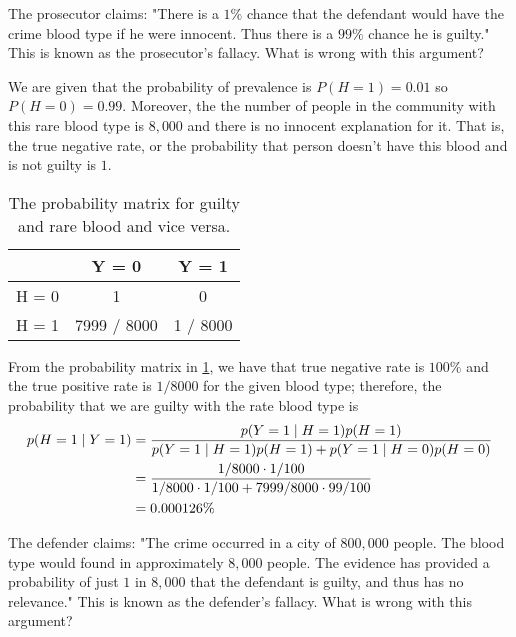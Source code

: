 \begin{exercise}
	\begin{exercise}
		\item
			The prosecutor claims: "There is a \(1\%\) chance that the defendant would have the crime blood type if he
			were innocent. Thus there is a \(99\%\) chance he is guilty." This is known as the prosecutor's fallacy.
			What is wrong with this argument?
			\par\smallskip
			We are given that the probability of prevalence is \(P(H = 1) = 0.01\) so \(P(H = 0) = 0.99\). Moreover, the
			the number of people in the community with this rare blood type is \(8,000\) and there is no innocent
			explanation for it. That is, the true negative rate, or the probability that person doesn't have this blood
			and is not guilty is \(1\).
			\begin{table}
			\centering
				\begin{tabular}{l | c c}
					& Y = 0 & Y = 1\\ \hline
					H = 0 & 1 & 0\\
					H = 1 & 7999 / 8000 & 1 / 8000
				\end{tabular}
				\caption{The probability matrix for guilty and rare blood and vice versa.}
				\label{ch2_ex21}
			\end{table}
			From the probability matrix in \cref{ch2_ex21}, we have that true negative rate is \(100\%\) and the true 
			positive rate is \(1 / 8000\) for the given blood type; therefore, the probability that we are guilty with the
			rate blood type is
			\begin{align}
				p(H = 1\mid Y = 1) 
				&= \frac{p(Y = 1\mid H = 1) p(H = 1)}{p(Y = 1\mid H = 1) p(H = 1) + p(Y = 1\mid H = 0) p(H = 0)}
				\notag\\
				&= \frac{1 / 8000\cdot 1 / 100}{1 / 8000\cdot 1 / 100 + 7999 / 8000 \cdot 99 / 100}\notag\\
				&= 0.000126\%\notag
			\end{align}
		\item
			The defender claims: "The crime occurred in a city of \(800,000\) people. The blood type would found in
			approximately \(8,000\) people. The evidence has provided a probability of just \(1\) in \(8,000\) that the
			defendant is guilty, and thus has no relevance." This is known as the defender's fallacy. 
			What is wrong with this argument?
	\end{exercise}
\end{exercise}